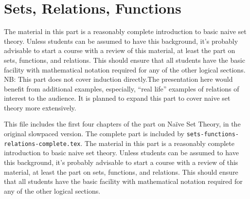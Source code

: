 \documentclass[../../include/open-logic-part]{subfiles}
\begin{document}
\part{Sets, Relations, Functions}

\begin{editorial}
  The material in this part is a reasonably complete introduction to basic naive set theory. Unless students can be assumed to have this background, it's probably advisable to start a course with a review of this material, at least the part on sets, functions, and relations. This should ensure that all students have the basic facility with mathematical notation required for any of the other logical sections. NB: This part does not cover induction directly.The presentation here would benefit from additional examples, especially, ``real life'' examples of relations of interest to the audience. It is planned to expand this part to cover naive set theory more extensively.
\end{editorial}


\begin{editorial}
  This file includes the first four chapters of the part on Na\"ive
  Set Theory, in the original slowpaced version. The complete part is
  included by \verb|sets-functions-relations-complete.tex|. The
  material in this part is a reasonably complete introduction to basic
  naive set theory. Unless students can be assumed to have this
  background, it's probably advisable to start a course with a review
  of this material, at least the part on sets, functions, and
  relations. This should ensure that all students have the basic
  facility with mathematical notation required for any of the other
  logical sections.
\end{editorial}





\OLEndPartHook
\end{document}

